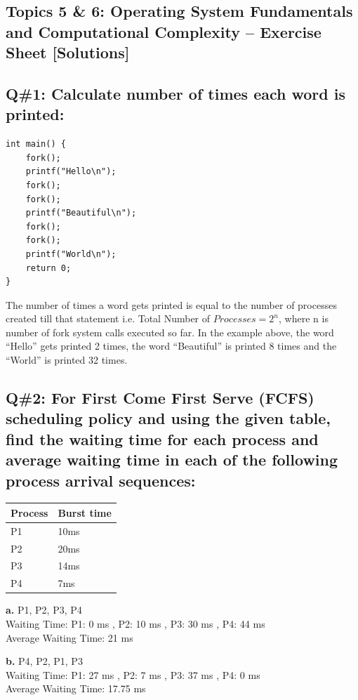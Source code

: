 \subsection{Topics 5 \& 6: Operating System Fundamentals and Computational Complexity – Exercise Sheet [Solutions]}
\subsection*{Q\#1: Calculate number of times each word is printed:}
\begin{lstlisting}
int main() {
    fork();
    printf("Hello\n");
    fork();
    fork();
    printf("Beautiful\n");
    fork();
    fork();
    printf("World\n");
    return 0;
}
\end{lstlisting}
The number of times a word gets printed is equal to the number of processes created till that statement  
i.e. Total Number of \(Processes = 2^n\), where n is number of fork system calls executed so far.
In the example above, the word “Hello” gets printed 2 times, the word “Beautiful” is printed 8 times  
and the “World” is printed 32 times.

\subsection*{Q\#2: For First Come First Serve (FCFS) scheduling policy and using the given table, find the waiting  
time for each process and average waiting time in each of the following process arrival sequences:}

\begin{table}[htbp]
\begin{tabularx}{\textwidth}{| X | X |}
\hline
\textbf{Process} & \textbf{Burst time} \\
\hline
P1 & 10ms \\
\hline
P2 & 20ms \\
\hline
P3 & 14ms \\
\hline
P4 & 7ms \\
\hline
\end{tabularx}
\end{table}
\textbf{a.} P1, P2, P3, P4  \\
Waiting Time: P1: 0 ms , P2: 10 ms , P3: 30 ms , P4: 44 ms  \\
Average Waiting Time: 21 ms

\textbf{b.} P4, P2, P1, P3  \\
Waiting Time: P1: 27 ms , P2: 7 ms , P3: 37 ms , P4: 0 ms  \\
Average Waiting Time: 17.75 ms


